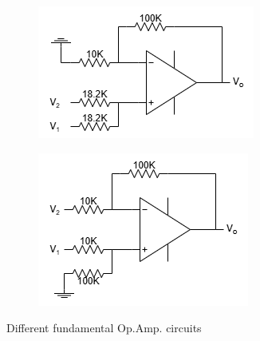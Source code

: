 \begin{figure}[h]
    \vspace{0.2 cm}
        \begin{subfigure}[h]{0.47\textwidth}
        \begin{center}
            \includegraphics[width=1\linewidth]{Lab10/Lab10e.drawio.png}
            \caption{}
            \label{L10e}
        \end{center}
        \end{subfigure}
    \hfill
        \begin{subfigure}[h]{0.47\textwidth}
        \begin{center}
            \includegraphics[width=1\linewidth]{Lab10/Lab10f.drawio.png}
            \caption{}
            \label{L10f}
        \end{center}
        \end{subfigure}
    \caption{Different fundamental Op.Amp. circuits}
    \label{l10fs}
    
    \end{figure}
    \FloatBarrier

